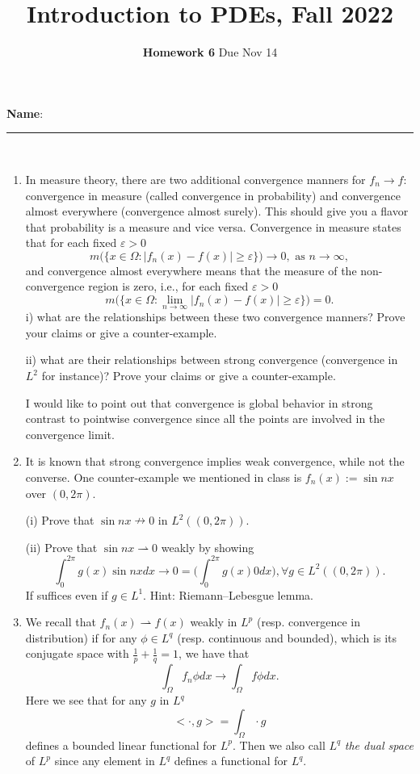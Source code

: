 \documentclass[6pt]{article}
\title{Introduction to PDEs, Fall 2022}
\author{\textbf{Homework 6} Due Nov 14}
\date{}
\numberwithin{equation}{section}
\begin{document}
\maketitle

\textbf{Name}:\rule{1 in}{0.001 in} \\


\begin{enumerate}
\item In measure theory, there are two additional convergence manners for $f_n\rightarrow f$: convergence in measure (called convergence in probability) and convergence almost everywhere (convergence almost surely).  This should give you a flavor that probability is a measure and vice versa.  Convergence in measure states that for each fixed $\varepsilon>0$
    \[m\big(\{x\in\Omega: |f_n(x)-f(x)|\geq\varepsilon\}\big)\rightarrow 0, \text{~as~}n\rightarrow \infty,\]
    and convergence almost everywhere means that the measure of the non-convergence region is zero, i.e., for each fixed $\varepsilon>0$
    \[m\big(\{x\in\Omega: \lim_{n\rightarrow\infty}|f_n(x)-f(x)|\geq\varepsilon\}\big)=0.\]
i) what are the relationships between these two convergence manners?  Prove your claims or give a counter-example.

ii) what are their relationships between strong convergence (convergence in $L^2$ for instance)?  Prove your claims or give a counter-example.

I would like to point out that convergence is global behavior in strong contrast to pointwise convergence since all the points are involved in the convergence limit.

\item  It is known that strong convergence implies weak convergence, while not the converse.  One counter-example we mentioned in class is $f_n(x):=\sin nx$ over $(0,2\pi)$.

(i)  Prove that $\sin nx \nrightarrow 0 $ in $L^2((0,2\pi))$.

(ii)  Prove that
$\sin nx \rightharpoonup 0$ weakly by showing
\[\int_0^{2\pi} g(x)\sin nx dx\rightarrow 0=\Big(\int_0^{2\pi} g(x)0  dx\Big),\forall g\in L^2((0,2\pi)).\]
If suffices even if $g\in L^1$.  Hint: Riemann--Lebesgue lemma.

\item  We recall that $f_n(x) \rightharpoonup f(x)$ weakly in $L^p$ (resp. convergence in distribution) if for any $\phi\in L^q$ (resp. continuous and bounded), which is its conjugate space with $\frac{1}{p}+\frac{1}{q}=1$, we have that
\[\int_\Omega f_n\phi dx\rightarrow \int_\Omega f\phi dx.\]
Here we see that for any $g$ in $L^q$
\[<\cdot, g>=\int_\Omega \cdot g\]
defines a bounded linear functional for $L^p$.  Then we also call $L^q$ \emph{the dual space} of $L^p$ since any element in $L^q$ defines a functional for $L^q$.


\end{enumerate}
\end{document}
